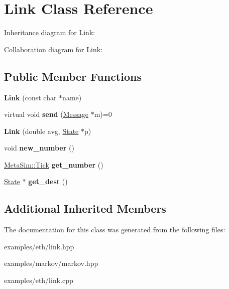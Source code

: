 \hypertarget{classLink}{}\section{Link Class Reference}
\label{classLink}


Inheritance diagram for Link\+:


Collaboration diagram for Link\+:
\subsection*{Public Member Functions}
\begin{DoxyCompactItemize}
\item 
{\bfseries Link} (const char $\ast$name)\hypertarget{classLink_a11b49d430dfd9747f2880b539a7a40c9}{}\label{classLink_a11b49d430dfd9747f2880b539a7a40c9}

\item 
virtual void {\bfseries send} (\hyperlink{classMessage}{Message} $\ast$m)=0\hypertarget{classLink_aaee31efa4eecfa5d84ca29491a678876}{}\label{classLink_aaee31efa4eecfa5d84ca29491a678876}

\item 
{\bfseries Link} (double avg, \hyperlink{classState}{State} $\ast$p)\hypertarget{classLink_afbe56e5a569fe259d733d59d50eb0cd6}{}\label{classLink_afbe56e5a569fe259d733d59d50eb0cd6}

\item 
void {\bfseries new\+\_\+number} ()\hypertarget{classLink_adfa9581a4e65b7176c1b0463e009e1c5}{}\label{classLink_adfa9581a4e65b7176c1b0463e009e1c5}

\item 
\hyperlink{classMetaSim_1_1Tick}{Meta\+Sim\+::\+Tick} {\bfseries get\+\_\+number} ()\hypertarget{classLink_a98f25e14b4c5f04b222334e36d14d9d2}{}\label{classLink_a98f25e14b4c5f04b222334e36d14d9d2}

\item 
\hyperlink{classState}{State} $\ast$ {\bfseries get\+\_\+dest} ()\hypertarget{classLink_a9e0077efc45af5f5da5cb7b7787e98b9}{}\label{classLink_a9e0077efc45af5f5da5cb7b7787e98b9}

\end{DoxyCompactItemize}
\subsection*{Additional Inherited Members}


The documentation for this class was generated from the following files\+:\begin{DoxyCompactItemize}
\item 
examples/eth/link.\+hpp\item 
examples/markov/markov.\+hpp\item 
examples/eth/link.\+cpp\end{DoxyCompactItemize}
